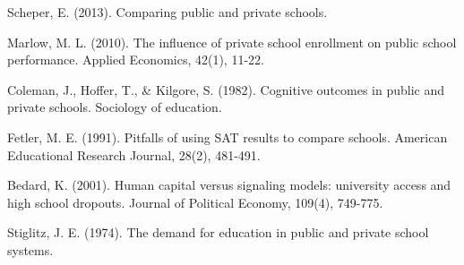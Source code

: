 \documentclass[12pt]{article}
\begin{document}
\newpage
\begin{thebibliography}{9}

Scheper, E. (2013). Comparing public and private schools.

Marlow, M. L. (2010). The influence of private school enrollment on public school performance. Applied Economics, 42(1), 11-22.

Coleman, J., Hoffer, T., \& Kilgore, S. (1982). Cognitive outcomes in public and private schools. Sociology of education.

Fetler, M. E. (1991). Pitfalls of using SAT results to compare schools. American Educational Research Journal, 28(2), 481-491.

Bedard, K. (2001). Human capital versus signaling models: university access and high school dropouts. Journal of Political Economy, 109(4), 749-775.

Stiglitz, J. E. (1974). The demand for education in public and private school systems.

\end{thebibliography}

\newpage
\listoftables
\end{document}
